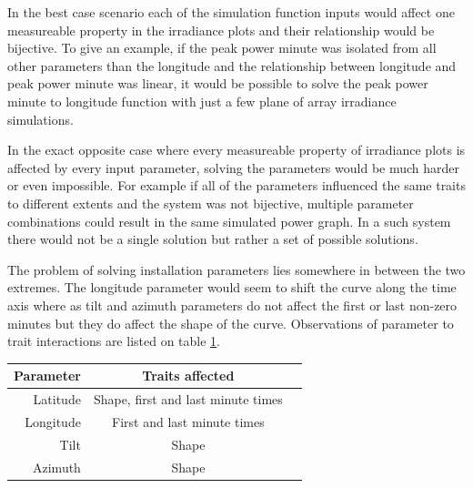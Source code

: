 \noindent In the best case scenario each of the simulation function inputs would affect one measureable property in the irradiance plots and their relationship would be bijective. To give an example, if the peak power minute was isolated from all other parameters than the longitude and the relationship between longitude and peak power minute was linear, it would be possible to solve the peak power minute to longitude function with just a few plane of array irradiance simulations.

In the exact opposite case where every measureable property of irradiance plots is affected by every input parameter, solving the parameters would be much harder or even impossible. For example if all of the parameters influenced the same traits to different extents and the system was not bijective, multiple parameter combinations could result in the same simulated power graph. In a such system there would not be a single solution but rather a set of possible solutions.

The problem of solving installation parameters lies somewhere in between the two extremes. The longitude parameter would seem to shift the curve along the time axis where as tilt and azimuth parameters do not affect the first or last non-zero minutes but they do affect the shape of the curve. Observations of parameter to trait interactions are listed on table \ref{table_traits}.



\begin{table}[H]
\centering
\begin{tabular}{r|cc} \hline\hline

 Parameter & Traits affected\\ \hline
 Latitude & Shape, first and last minute times\\
 Longitude & First and last minute times\\
 Tilt & Shape\\
 Azimuth & Shape\\

\hline\hline
\end{tabular}
\label{table_traits}
\end{table}






